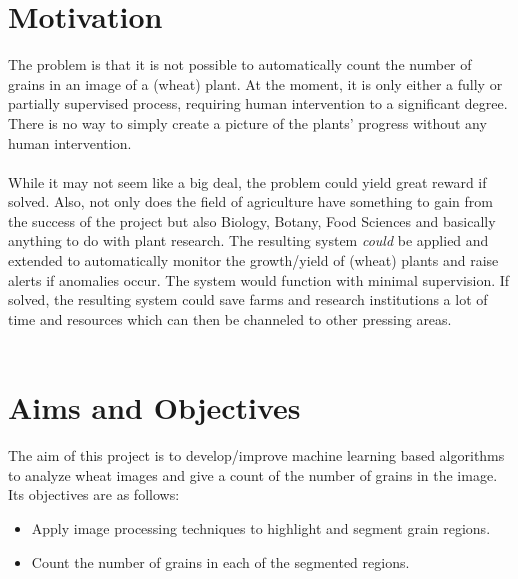 \section{Motivation}
The problem is that it is not possible to automatically count the number of grains in an image of a (wheat) plant. At the moment, it is only either a fully or partially supervised process, requiring human intervention to a significant degree. There is no way to simply create a picture of the plants' progress without any human intervention.\\ \\
%
While it may not seem like a big deal, the problem could yield great reward if solved. Also, not only does the field of agriculture have something to gain from the success of the project but also Biology, Botany, Food Sciences and basically anything to do with plant research. The resulting system \textit{could} be applied and extended to automatically monitor the growth/yield of (wheat) plants and raise alerts if anomalies occur. The system would function with minimal supervision. If solved, the resulting system could save farms and research institutions a lot of time and resources which can then be channeled to other pressing areas.\\ \\


\bigskip

\goodbreak

\section{Aims and Objectives}
The aim of this project is to develop/improve machine learning based algorithms to analyze wheat images and give a count of the number of grains in the image. Its objectives are as follows:
\begin{itemize}
\item Apply image processing techniques to highlight and segment grain regions.
\item Count the number of grains in each of the segmented regions.
\end{itemize}



